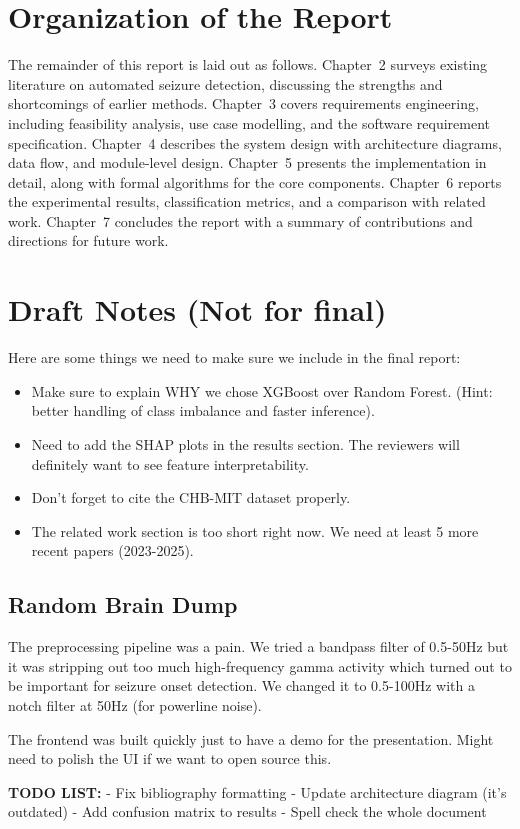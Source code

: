 \section{Organization of the Report}

The remainder of this report is laid out as follows. Chapter~2 surveys existing literature on automated seizure detection, discussing the strengths and shortcomings of earlier methods. Chapter~3 covers requirements engineering, including feasibility analysis, use case modelling, and the software requirement specification. Chapter~4 describes the system design with architecture diagrams, data flow, and module-level design. Chapter~5 presents the implementation in detail, along with formal algorithms for the core components. Chapter~6 reports the experimental results, classification metrics, and a comparison with related work. Chapter~7 concludes the report with a summary of contributions and directions for future work.



\section*{Draft Notes (Not for final)}
Here are some things we need to make sure we include in the final report:
\begin{itemize}
    \item Make sure to explain WHY we chose XGBoost over Random Forest. (Hint: better handling of class imbalance and faster inference).
    \item Need to add the SHAP plots in the results section. The reviewers will definitely want to see feature interpretability.
    \item Don't forget to cite the CHB-MIT dataset properly.
    \item The related work section is too short right now. We need at least 5 more recent papers (2023-2025).
\end{itemize}

\subsection*{Random Brain Dump}
The preprocessing pipeline was a pain. We tried a bandpass filter of 0.5-50Hz but it was stripping out too much high-frequency gamma activity which turned out to be important for seizure onset detection. We changed it to 0.5-100Hz with a notch filter at 50Hz (for powerline noise).

The frontend was built quickly just to have a demo for the presentation. Might need to polish the UI if we want to open source this.

\textbf{TODO LIST:}
- Fix bibliography formatting
- Update architecture diagram (it's outdated)
- Add confusion matrix to results
- Spell check the whole document
